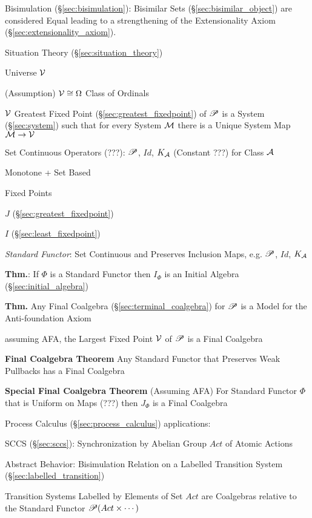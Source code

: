 Bisimulation (\S\ref{sec:bisimulation}): Bisimilar Sets
(\S\ref{sec:bisimilar_object}) are considered Equal leading to a
strengthening of the Extensionality Axiom
(\S\ref{sec:extensionality_axiom}).

Situation Theory (\S\ref{sec:situation_theory})

Universe $\mathcal{V}$

(Assumption) $\mathcal{V} \cong \Omega$ Class of Ordinals

$\mathcal{V}$ Greatest Fixed Point (\S\ref{sec:greatest_fixedpoint}) of
$\mathscr{P}$ is a System (\S\ref{sec:system}) such that for every System
$\mathcal{M}$ there is a Unique System Map $\mathcal{M} \rightarrow
\mathcal{V}$

Set Continuous Operators (???): $\mathscr{P}$, $Id$, $K_\mathcal{A}$ (Constant
???) for Class $\mathcal{A}$

Monotone + Set Based

Fixed Points

$J$ (\S\ref{sec:greatest_fixedpoint})

$I$ (\S\ref{sec:least_fixedpoint})

\emph{Standard Functor}: Set Continuous and Preserves Inclusion Maps,
e.g. $\mathscr{P}$, $Id$, $K_\mathcal{A}$

\textbf{Thm.}: If $\Phi$ is a Standard Functor then $I_\Phi$ is an
Initial Algebra (\S\ref{sec:initial_algebra})

\textbf{Thm.} Any Final Coalgebra (\S\ref{sec:terminal_coalgebra}) for
$\mathscr{P}$ is a Model for the Anti-foundation Axiom

assuming AFA, the Largest Fixed Point $\mathcal{V}$ of $\mathscr{P}$ is a Final
Coalgebra

\textbf{Final Coalgebra Theorem} Any Standard Functor that Preserves
Weak Pullbacks has a Final Coalgebra

\textbf{Special Final Coalgebra Theorem} (Assuming AFA) For Standard
Functor $\Phi$ that is Uniform on Maps (???) then $J_\Phi$ is a Final
Coalgebra

Process Calculus (\S\ref{sec:process_calculus}) applications:

SCCS (\S\ref{sec:sccs}): Synchronization by Abelian Group $Act$ of
Atomic Actions

Abstract Behavior: Bisimulation Relation on a Labelled Transition
System (\S\ref{sec:labelled_transition})

Transition Systems Labelled by Elements of Set $Act$ are Coalgebras
relative to the Standard Functor $\mathscr{P}(Act \times \cdots)$

